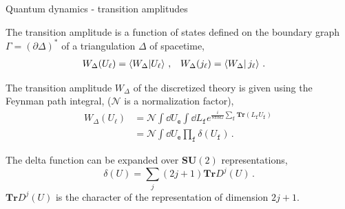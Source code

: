 \documentclass{beamer}
\begin{document}
\begin{frame}{Quantum dynamics - transition amplitudes}
    \begin{list}{\maltese}{\leftmargin=1em \itemindent=0em}
        \item<1-> The transition amplitude is a function of states defined on the boundary graph $\Gamma=\left(\partial\Delta\right)^\text{*}$ of a triangulation $\Delta$ of spacetime,
        \begin{align}
            W_\Delta(U_\ell)&=\braket{W_\Delta}{U_\ell}\,, &W_\Delta(j_\ell)&=\braket{W_\Delta}{\,j_\ell}\,.
        \end{align}
        \item<2-> The transition amplitude $W_\Delta$ of the discretized theory is given using the Feynman path integral, ($\mathcal{N}$ is a normalization factor),
        \begin{align}
            W_\Delta(U_\ell)&=\mathcal{N}\int\dd{U_\mathtt{e}}\int\dd{L_\mathtt{f}}e^{\frac{i}{8\pi\hbar G}\sum_\mathtt{f}\mathbf{Tr}(L_\mathtt{f} U_\mathtt{f})}\,\\
            &=\mathcal{N}\int\dd{U_\mathtt{e}}\prod_\mathtt{f}\delta(U_\mathtt{f})\,.
        \end{align}
        \item<3-> The delta function can be expanded over $\mathbf{SU}(2)$ representations,
        \begin{equation}
            \delta(U)=\sum_j(2j+1)\mathbf{Tr}D^{j}(U)\,.
        \end{equation}
        $\mathbf{Tr}D^{j}(U)$ is the character of the representation of dimension $2j+1$.
    \end{list}
\end{frame}
\end{document}
